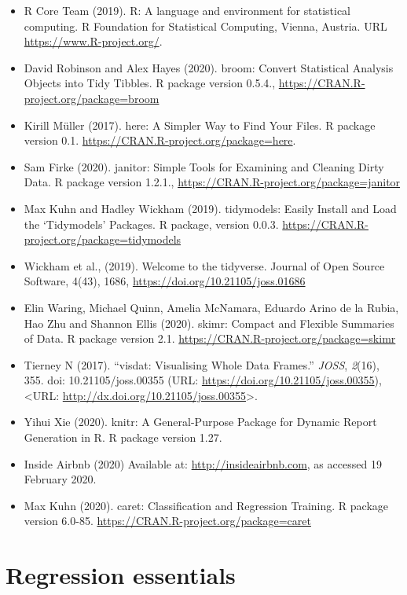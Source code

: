 \documentclass[
]{book}
\providecommand{\tightlist}{%
  \setlength{\itemsep}{0pt}\setlength{\parskip}{0pt}}
\begin{document}
\begin{itemize}
\tightlist
\item
  R Core Team (2019). R: A language and environment for statistical computing. R Foundation for Statistical Computing, Vienna, Austria. URL \url{https://www.R-project.org/}.
\item
  David Robinson and Alex Hayes (2020). broom: Convert Statistical Analysis Objects into Tidy Tibbles. R package version 0.5.4., \url{https://CRAN.R-project.org/package=broom}
\item
  Kirill Müller (2017). here: A Simpler Way to Find Your Files. R package version 0.1. \url{https://CRAN.R-project.org/package=here}.
\item
  Sam Firke (2020). janitor: Simple Tools for Examining and Cleaning Dirty Data. R package version 1.2.1., \url{https://CRAN.R-project.org/package=janitor}
\item
  Max Kuhn and Hadley Wickham (2019). tidymodels: Easily Install and Load the `Tidymodels' Packages. R package, version 0.0.3. \url{https://CRAN.R-project.org/package=tidymodels}
\item
  Wickham et al., (2019). Welcome to the tidyverse. Journal of Open Source Software, 4(43), 1686, \url{https://doi.org/10.21105/joss.01686}
\item
  Elin Waring, Michael Quinn, Amelia McNamara, Eduardo Arino de la Rubia, Hao Zhu and Shannon Ellis (2020). skimr: Compact and Flexible Summaries of Data. R package version 2.1. \url{https://CRAN.R-project.org/package=skimr}
\item
  Tierney N (2017). ``visdat: Visualising Whole Data Frames.'' \emph{JOSS}, \emph{2}(16), 355. doi: 10.21105/joss.00355 (URL: \url{https://doi.org/10.21105/joss.00355}), \textless URL: \url{http://dx.doi.org/10.21105/joss.00355}\textgreater.
\item
  Yihui Xie (2020). knitr: A General-Purpose Package for Dynamic Report Generation in R. R package version 1.27.
\item
  Inside Airbnb (2020) Available at: \url{http://insideairbnb.com}, as accessed 19 February 2020.
\item
  Max Kuhn (2020). caret: Classification and Regression Training. R package version 6.0-85. \url{https://CRAN.R-project.org/package=caret}
\end{itemize}

\hypertarget{regression-essentials}{%
\chapter{Regression essentials}\label{regression-essentials}}
\end{document}
